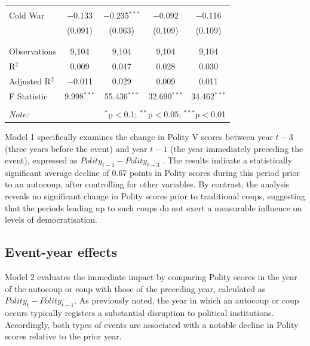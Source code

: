 \documentclass[
  12pt,
]{report}
\begin{document}
\begin{table}
{\begin{tabular}{@{\extracolsep{30pt}}lcccc}
  & & & & \\ 
 Cold War & $-$0.133 & $-$0.235$^{***}$ & $-$0.092 & $-$0.116 \\ 
  & (0.091) & (0.063) & (0.109) & (0.109) \\ 
  & & & & \\ 
\hline \\[-1.8ex] 
Observations & 9,104 & 9,104 & 9,104 & 9,104 \\ 
R$^{2}$ & 0.009 & 0.047 & 0.028 & 0.030 \\ 
Adjusted R$^{2}$ & $-$0.011 & 0.029 & 0.009 & 0.011 \\ 
F Statistic & 9.998$^{***}$ & 55.436$^{***}$ & 32.690$^{***}$ & 34.462$^{***}$ \\ 
\hline 
\hline \\[-1.8ex] 
\textit{Note:}  & \multicolumn{4}{r}{$^{*}$p$<$0.1; $^{**}$p$<$0.05; $^{***}$p$<$0.01} \\ 
\end{tabular}

}

\end{table}%

Model 1 specifically examines the change in Polity V scores between year
\(t−3\) (three years before the event) and year \(t−1\) (the year
immediately preceding the event), expressed as
\(Polity_{t−1} - Polity_{t−3}\) . The results indicate a statistically
significant average decline of 0.67 points in Polity scores during this
period prior to an autocoup, after controlling for other variables. By
contrast, the analysis reveals no significant change in Polity scores
prior to traditional coups, suggesting that the periods leading up to
such coups do not exert a measurable influence on levels of
democratisation.

\subsection*{Event-year effects}\label{event-year-effects}

Model 2 evaluates the immediate impact by comparing Polity scores in the
year of the autocoup or coup with those of the preceding year,
calculated as \(Polity_{t} - Polity_{t-1}\). As previously noted, the
year in which an autocoup or coup occurs typically registers a
substantial disruption to political institutions. Accordingly, both
types of events are associated with a notable decline in Polity scores
relative to the prior year.
\end{document}
